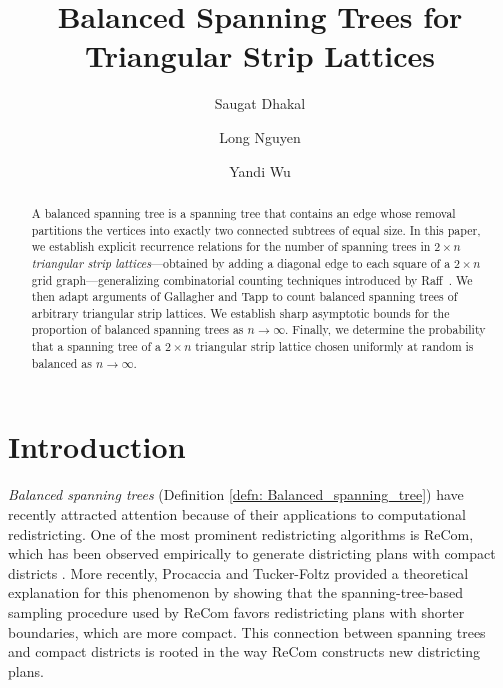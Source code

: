 \documentclass{amsart}
\title{Balanced Spanning Trees for Triangular Strip Lattices}
\author{Saugat Dhakal}
\author{Long Nguyen}
\author{Yandi Wu}
\theoremstyle{definition}
\newcommand{\saugat}[1]{\marginpar{\tiny \color{blue} Saugat: #1}}
\newcommand{\blue}[1]{\textcolor{blue}{#1}}
\newcommand{\red}[1]{\textcolor{red}{#1}}
\newcommand{\purple}[1]{\textcolor{purple}{#1}}
\begin{document}
\maketitle
\begin{abstract}
    A balanced spanning tree is a spanning tree that contains an edge whose removal partitions the vertices into exactly two connected subtrees of equal size. In this paper, we establish explicit recurrence relations for the number of spanning trees in $2 \times n$ \textit{triangular strip lattices}—obtained by adding a diagonal edge to each square of a $2 \times n$ grid graph—generalizing combinatorial counting techniques introduced by Raff~\cite{raff}.  We then adapt arguments of Gallagher and Tapp \cite{gal25} to count balanced spanning trees of arbitrary triangular strip lattices. We establish sharp asymptotic bounds for the proportion of balanced spanning trees as $n \to \infty$. Finally, we determine the probability that a spanning tree of a $2\times n$ triangular strip lattice chosen uniformly at random is balanced as $n \to \infty$.
\end{abstract}






\section{Introduction}

\emph{Balanced spanning trees} (Definition \ref{defn: Balanced_spanning_tree}) have recently attracted attention because of their applications to computational redistricting. One of the most prominent redistricting algorithms is ReCom, which has been observed empirically to generate districting plans with compact districts \cite{deford2021recombination,clelland2021compactness}. More recently, Procaccia and Tucker-Foltz \cite{procaccia2022compact} provided a theoretical explanation for this phenomenon by showing that the spanning-tree-based sampling procedure used by ReCom favors redistricting plans with shorter boundaries, which are more compact. This connection between spanning trees and compact districts is rooted in the way ReCom constructs new districting plans. 
\end{document}
